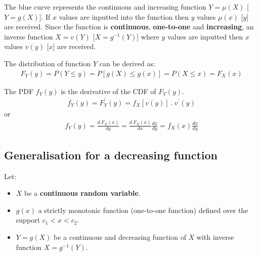 \documentclass[10pt,a4paper]{article}
\begin{document}
The blue curve represents the continuous and increasing function $Y=\mu(X)$ [$Y=g(X)$]. If $x$
values are inputted into the function then $y$ values $\mu(x)$ [$y$] are received. Since the function is \textbf{continuous}, \textbf{one-to-one} and
\textbf{increasing}, an inverse function $X=v(Y)$ [$X=g^{-1}(Y)$] where $y$ values are inputted then $x$
values $v(y)$ [$x$] are received.

The distribution of function $Y$ can be derived as:
\begin{align*}
    F_Y(y) = P(Y\leq y) = P[g(X) \leq g(x)] = P(X\leq x) = F_X (x)
\end{align*}

\begin{tcolorbox}[breakable,colback=white] 
    The PDF $f_Y(y)$ is the derivative of the CDF of $F_Y(y)$. 
    \begin{align*}
        f_Y(y) = F^\prime_Y (y) = f_X[v(y)]\: . \: v^\prime(y)
    \end{align*}
    or 
    \begin{align*}
        f_Y(y) = \frac{d\: F_X(x)}{dy} = \frac{d\: F_X (x)}{dx} \frac{dx}{dy} = f_X(x)\frac{dx}{dy}
    \end{align*}
\end{tcolorbox}

\subsection{Generalisation for a decreasing function}

Let:
\begin{itemize}
    \item $X$ be a \textbf{continuous random variable}.
    \item $g(x)$ a strictly monotonic function (one-to-one function) defined over the support $c_1 < x < c_2$.
    \item $Y = g(X)$ be a continuous and decreasing function of $X$ with inverse function $X=g^{-1}(Y)$.
\end{itemize} 
\end{document}
